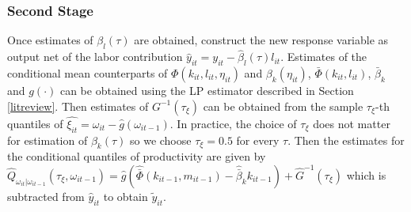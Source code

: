 \documentclass[11pt]{article}
\begin{document}
\subsubsection*{Second Stage}
Once estimates of $\beta_{l}(\tau)$ are obtained, construct the new response variable as output net of the labor contribution $\hat{y}_{it}=y_{it}-\hat{\beta}_{l}(\tau)l_{it}$. Estimates of the conditional mean counterparts of $\Phi(k_{it}, l_{it}, \eta_{it})$ and $\beta_{k}(\eta_{it})$, $\bar{\Phi}(k_{it}, l_{it})$, $\bar{\beta}_{k}$ and $g(\cdot)$ can be obtained using the LP estimator described in Section \ref{litreview}. Then estimates of $G^{-1}(\tau_{\xi})$ can be obtained from the sample $\tau_{\xi}$-th quantiles of $\hat{\xi_{it}}=\omega_{it}-\hat{g}(\omega_{it-1})$. In practice, the choice of $\tau_{\xi}$ does not matter for estimation of $\beta_{k}(\tau)$ so we choose $\tau_{\xi}=0.5$ for every $\tau$. Then the estimates for the conditional quantiles of productivity are given by $\hat{Q}_{\omega_{it}|\omega_{it-1}}(\tau_{\xi}, \omega_{it-1})=\hat{g}(\hat{\bar{\Phi}}(k_{it-1}, m_{it-1})-\hat{\bar{\beta}}_{k}k_{it-1})+\hat{G}^{-1}(\tau_{\xi})$ which is subtracted from $\hat{y}_{it}$ to obtain $\tilde{y}_{it}$.
\end{document}
